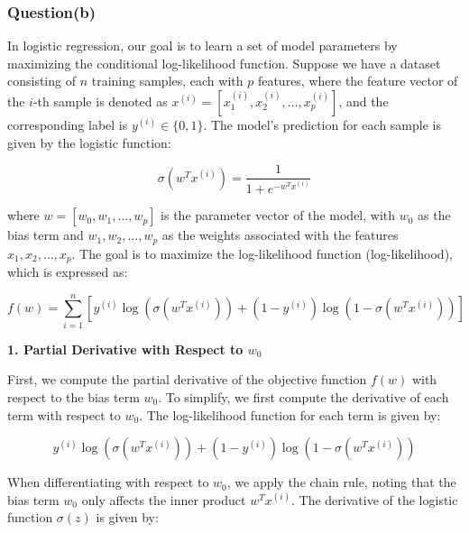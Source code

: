 \documentclass[a4paper, utf8]{ctexart}
\begin{document}
	
	\subsubsection{Question(b)}
	
	In logistic regression, our goal is to learn a set of model parameters by maximizing the conditional log-likelihood function. Suppose we have a dataset consisting of $n$ training samples, each with $p$ features, where the feature vector of the $i$-th sample is denoted as $x^{(i)} = [x_1^{(i)}, x_2^{(i)}, \dots, x_p^{(i)}]$, and the corresponding label is $y^{(i)} \in \{0, 1\}$. The model's prediction for each sample is given by the logistic function:
	
	\vspace{-.5em}
	\begin{equation}
		\sigma(w^T x^{(i)}) = \frac{1}{1 + e^{-w^T x^{(i)}}}
		\nonumber
	\end{equation}
	
	where $ w = [w_0, w_1, \dots, w_p] $ is the parameter vector of the model, with $ w_0 $ as the bias term and $ w_1, w_2, \dots, w_p $ as the weights associated with the features $ x_1, x_2, \dots, x_p $. The goal is to maximize the log-likelihood function (log-likelihood), which is expressed as:
	
	\vspace{-.5em}
	\begin{equation}
		f(w) = \sum_{i=1}^{n} \left[ y^{(i)} \log(\sigma(w^T x^{(i)})) + (1 - y^{(i)}) \log(1 - \sigma(w^T x^{(i)})) \right]
		\nonumber
	\end{equation}
	
	\vspace{.5em}
	
	\textbf{1. Partial Derivative with Respect to $w_0$}
	
	\vspace{.5em}
	
	First, we compute the partial derivative of the objective function $f(w)$ with respect to the bias term $w_0$. To simplify, we first compute the derivative of each term with respect to $w_0$. The log-likelihood function for each term is given by:
	
	\vspace{-.5em}
	\begin{equation}
		y^{(i)} \log(\sigma(w^T x^{(i)})) + (1 - y^{(i)}) \log(1 - \sigma(w^T x^{(i)}))
		\nonumber
	\end{equation}
	
	When differentiating with respect to $w_0$, we apply the chain rule, noting that the bias term $w_0$ only affects the inner product $w^T x^{(i)}$. The derivative of the logistic function $ \sigma(z) $ is given by:
	
\end{document}
